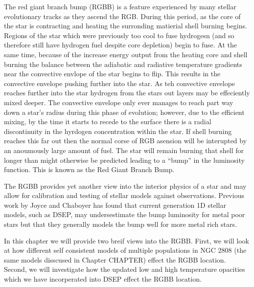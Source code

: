 The red giant branch bump (RGBB) is a feature experienced by many stellar
evolutionary tracks as they ascend the RGB. During this period, as the core of
the star is contracting and heating the surronding matierial shell burning
begins. Regions of the star which were previously too cool to fuse hydrogesn
(and so therefore still have hydrogen fuel despite core depletion) begin to
fuse. At the same time, because of the increase energy output from the heating
core and shell burning the balance between the adiabatic and radiative
temperature gradients near the convective envlope of the star begins to flip.
This results in the convective envelope pushing further into the star. As teh
convective envelope reaches further into the star hydrogen from the stars out
layers may be effeciently mixed deeper. The convective envelope only ever
manages to reach part way down a star's radius during this phase of evolution;
however, due to the efficient mixing, by the time it starts to recede to the
surface there is a radial discontinuity in the hyrdogen concentration within
the star. If shell burning reaches this far out then the normal corse of RGB
asension will be interupted by an anoumously large amount of fuel. The star
will remain burning that shell for longer than might otherwise be predicted
leading to a ``bump'' in the luminosity function. This is known as the Red
Giant Branch Bump.

The RGBB provides yet another view into the interior physics of a star and may
allow for calibration and testing of stellar models against observations.
Previous work by {\color{red}Joyce and Chaboyer} has found that current
generation 1D stellar models, such as DSEP, may undersestimate the bump
luminosity for metal poor stars but that they generally models the bump well
for more metal rich stars.

In this chapter we will provide two breif views into the RGBB. First, we will
look at how different self consistent models of multiple populations in NGC
2808 (the same models disscused in Chapter {\color{red} CHAPTER}) effect the
RGBB location. Second, we will investigate how the updated low and high
temperature opacities which we have incorperated into DSEP effect the RGBB
location.
